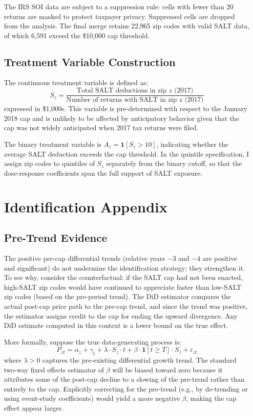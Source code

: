\documentclass[12pt]{article}
\begin{document}
The IRS SOI data are subject to a suppression rule: cells with fewer than 20 returns are masked to protect taxpayer privacy. Suppressed cells are dropped from the analysis. The final merge retains 22,965 zip codes with valid SALT data, of which 6,591 exceed the \$10,000 cap threshold.

\subsection{Treatment Variable Construction}

The continuous treatment variable is defined as:
\[
S_z = \frac{\text{Total SALT deductions in zip } z \text{ (2017)}}{\text{Number of returns with SALT in zip } z \text{ (2017)}}
\]
expressed in \$1,000s. This variable is pre-determined with respect to the January 2018 cap and is unlikely to be affected by anticipatory behavior given that the cap was not widely anticipated when 2017 tax returns were filed.

The binary treatment variable is $A_z = \mathbf{1}[S_z > 10]$, indicating whether the average SALT deduction exceeds the cap threshold. In the quintile specification, I assign zip codes to quintiles of $S_z$ separately from the binary cutoff, so that the dose-response coefficients span the full support of SALT exposure.

\section{Identification Appendix}
\label{sec:id_appendix}

\subsection{Pre-Trend Evidence}

The positive pre-cap differential trends (relative years $-3$ and $-4$ are positive and significant) do not undermine the identification strategy; they strengthen it. To see why, consider the counterfactual: if the SALT cap had not been enacted, high-SALT zip codes would have continued to appreciate faster than low-SALT zip codes (based on the pre-period trend). The DiD estimator compares the actual post-cap price path to the pre-cap trend, and since the trend was positive, the estimator assigns credit to the cap for ending the upward divergence. Any DiD estimate computed in this context is a lower bound on the true effect.

More formally, suppose the true data-generating process is:
\[
P_{zt} = \alpha_z + \gamma_t + \lambda \cdot S_z \cdot t + \beta \cdot \mathbf{1}[t \geq T] \cdot S_z + \varepsilon_{zt}
\]
where $\lambda > 0$ captures the pre-existing differential growth trend. The standard two-way fixed effects estimator of $\beta$ will be biased toward zero because it attributes some of the post-cap decline to a slowing of the pre-trend rather than entirely to the cap. Explicitly correcting for the pre-trend (e.g., by de-trending or using event-study coefficients) would yield a more negative $\beta$, making the cap effect appear larger.
\end{document}
